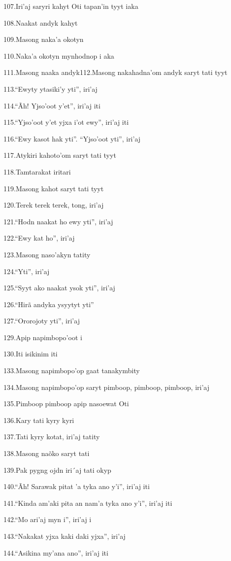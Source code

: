 107.Iri'aj saryri kahyt Oti tapan'in tyyt iaka

108.Naakat andyk kahyt

109.Masong naka'a okotyn

110.Naka'a okotyn mynhodnop i aka

111.Masong naaka andyk112.Masong nakahadna'om andyk saryt tati tyyt

113.``Ewyty ytasiki'y yti'', iri'aj

114.``Ãh! Yjso'oot y'et'', iri'aj iti

115.``Yjso'oot y'et yjxa i'ot ewy'', iri'aj iti

116.``Ewy kasot hak yti''. ``Yjso'oot yti'', iri'aj

117.Atykiri kahoto'om saryt tati tyyt

118.Tamtarakat iritari

119.Masong kahot saryt tati tyyt

120.Terek terek terek, tong, iri'aj

121.``Hodn naakat ho ewy yti'', iri'aj

122.``Ewy kat ho'', iri'aj

123.Masong naso'akyn tatity

124.``Yti'', iri'aj

125.``Syyt ako naakat ysok yti'', iri'aj

126.``Hirã andyka ysyytyt yti''

127.``Ororojoty yti'', iri'aj

129.Apip napimbopo'oot i

130.Iti isikinim iti

133.Masong napimbopo'op gaat tanakymbity

134.Masong napimbopo'op saryt pimboop, pimboop, pimboop, iri'aj

135.Pimboop pimboop apip nasoewat Oti

136.Kary tati kyry kyri

137.Tati kyry kotat, iri'aj tatity

138.Masong naõko saryt tati

139.Pak pygng ojdn iri´aj tati okyp

140.``Ãh! Sarawak pitat 'a tyka ano y'i'', iri'aj iti

141.``Kinda am'aki pita an nam'a tyka ano y'i'', iri'aj iti

142.``Mo ari'aj myn i'', iri'aj i

143.``Nakakat yjxa kaki daki yjxa'', iri'aj

144.``Asikina my'ana ano'', iri'aj iti

